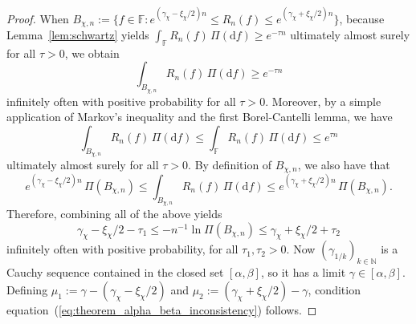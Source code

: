 \documentclass[10pt,a4paper]{amsart}
\def\FF{\mathbb{F}}
\def\NN{\mathbb{N}}
\def\eqref#1{equation~(\ref{#1})}
\begin{document}
\begin{proof}
    When $B_{\chi,n}:=\big\{f\in\FF : e^{(\gamma_\chi - \xi_\chi/2) n}\leq R_n(f)\leq e^{(\gamma_\chi+\xi_\chi/2) n}\big\}$, because Lemma~\ref{lem:schwartz} yields $\int_\mathbb F R_n(f)\, \Pi(\mathrm df)\geq e^{-\tau n}$ ultimately almost surely for all $\tau>0$, we obtain
    \begin{equation*}
        \int_{B_{\chi,n}} R_n(f)\, \Pi(\mathrm d f)\geq e^{-\tau n}
    \end{equation*}
    infinitely often with positive probability for all $\tau>0$. Moreover, by a simple application of Markov's inequality and the first Borel-Cantelli lemma, we have
    \begin{equation*}
        \int_{B_{\chi,n}} R_n(f)\, \Pi(\mathrm d f)\leq \int_{\mathbb F} R_n(f)\, \Pi(\mathrm d f)\leq e^{\tau n}
    \end{equation*}
    ultimately almost surely for all $\tau>0$. By definition of $B_{\chi,n}$, we also have that
    \begin{equation*}
        e^{(\gamma_\chi - \xi_\chi/2)n}\, \Pi(B_{\chi,n})\leq \int_{B_{\chi,n}} R_n(f)\, \Pi(\mathrm d f)\leq e^{(\gamma_\chi + \xi_\chi/2)n}\, \Pi(B_{\chi,n}).
    \end{equation*}
    Therefore, combining all of the above yields
    \begin{equation*}
        \gamma_\chi - \xi_\chi/2 - \tau_1 \leq -n^{-1}\ln\Pi(B_{\chi,n}) \leq \gamma_\chi + \xi_\chi/2 + \tau_2
    \end{equation*}
    infinitely often with positive probability, for all $\tau_1, \tau_2>0$. Now  $(\gamma_{1/k})_{k\in\NN}$ is a Cauchy sequence contained in the closed set $[\alpha,\beta]$, so it has a limit $\gamma\in[\alpha,\beta]$.
    Defining $\mu_1:=\gamma - (\gamma_\chi-\xi_\chi/2)$ and $\mu_2:=(\gamma_\chi+\xi_\chi/2)-\gamma$, condition \eqref{eq:theorem_alpha_beta_inconsistency} follows.
\end{proof}
\end{document}
